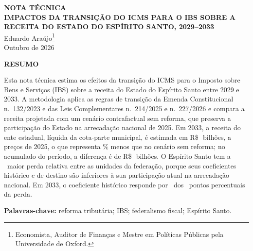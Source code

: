 \documentclass[12pt,a4paper]{article}
\newcommand{\Rs}{R\$\,}
\newcommand{\nn}{n.\textordmasculine}
\begin{document}

\clearpage
{}
\thispagestyle{empty}

\begin{center}
  \singlespacing
  {\bfseries NOTA TÉCNICA}\\[1.2em]
  {\bfseries\large IMPACTOS DA TRANSIÇÃO DO ICMS PARA O IBS SOBRE A RECEITA DO ESTADO DO ESPÍRITO SANTO, 2029--2033}\\[1.2em]
  Eduardo Araújo\footnote{Economista, Auditor de Finanças e Mestre em Políticas Públicas pela Universidade de Oxford.}\\[0.4em]
  Outubro de 2026
\end{center}

\vspace{1.2em}

\begin{center}\textbf{RESUMO}\end{center}
\begin{singlespace}
\noindent Esta nota técnica estima os efeitos da transição do ICMS para o Imposto sobre Bens e Serviços (IBS) sobre a receita do Estado do Espírito Santo entre 2029 e 2033. A metodologia aplica as regras de transição da Emenda Constitucional \nn~132/2023 e das Leis Complementares \nn~214/2025 e \nn~227/2026 e compara a receita projetada com um cenário contrafactual sem reforma, que preserva a participação do Estado na arrecadação nacional de 2025. Em 2033, a receita do ente estadual, líquida da cota-parte municipal, é estimada em \Rs\NumPosCinco\ bilhões, a preços de 2025, o que representa \NumVarFinalUma\% menos que no cenário sem reforma; no acumulado do período, a diferença é de \Rs\NumDifAcum\ bilhões. O Espírito Santo tem a \NumRank\textordfeminine\ maior perda relativa entre as unidades da federação, porque seus coeficientes histórico e de destino são inferiores à sua participação atual na arrecadação nacional. Em 2033, o coeficiente histórico responde por \NumDecCpt\ dos \NumVarFinalUma\ pontos percentuais da perda.

\medskip
\noindent\textbf{Palavras-chave:} reforma tributária; IBS; federalismo fiscal; Espírito Santo.
\end{singlespace}
\end{document}
